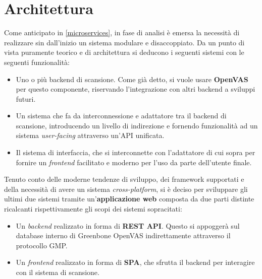 \section{Architettura}
Come anticipato in \ref{microservices}, in fase di analisi è emersa la necessità di realizzare sin dall'inizio un sistema modulare e disaccoppiato. Da un punto di vista puramente teorico e di architettura si deducono i seguenti sistemi con le seguenti funzionalità:
\begin{itemize}
    \item Uno o più backend di scansione. Come già detto, si vuole usare \textbf{OpenVAS} per questo componente, riservando l'integrazione con altri backend a sviluppi futuri.
    \item Un sistema che fa da interconnessione e adattatore tra il backend di scansione, introducendo un livello di indirezione e fornendo funzionalità ad un sistema \emph{user-facing} attraverso un'API unificata.
    \item Il sistema di interfaccia, che si interconnette con l'adattatore di cui sopra per fornire un \emph{frontend} facilitato e moderno per l'uso da parte dell'utente finale.
\end{itemize}
Tenuto conto delle moderne tendenze di sviluppo, dei framework supportati e della necessità di avere un sistema \emph{cross-platform}, si è deciso per sviluppare gli ultimi due sistemi tramite un'\textbf{applicazione web} composta da due parti distinte ricalcanti rispettivamente gli scopi dei sistemi sopracitati:
\begin{itemize}
    \item Un \emph{backend} realizzato in forma di \textbf{REST API}. Questo si appoggerà sul database interno di Greenbone OpenVAS indirettamente attraverso il protocollo GMP.
    \item Un \emph{frontend} realizzato in forma di \textbf{SPA}, che sfrutta il backend per interagire con il sistema di scansione.
\end{itemize}

